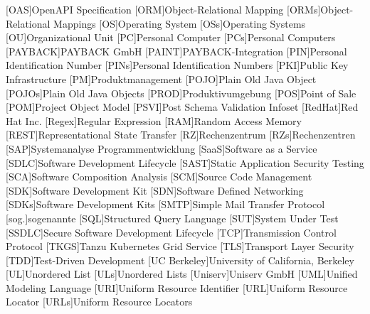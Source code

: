 \begin{acronym}[]
        [OAS]{OpenAPI Specification}
        [ORM]{Object-Relational Mapping}
        [ORMs]{Object-Relational Mappings}
        [OS]{Operating System}
        [OSs]{Operating Systems}
        [OU]{Organizational Unit}
        [PC]{Personal Computer}
        [PCs]{Personal Computers}
        [PAYBACK]{PAYBACK GmbH}
        [PAINT]{PAYBACK-Integration}
        [PIN]{Personal Identification Number}
        [PINs]{Personal Identification Numbers}
        [PKI]{Public Key Infrastructure}
        [PM]{Produktmanagement}
        [POJO]{Plain Old Java Object}
        [POJOs]{Plain Old Java Objects}
        [PROD]{Produktivumgebung}
        [POS]{Point of Sale}
        [POM]{Project Object Model}
        [PSVI]{Post Schema Validation Infoset}
        [RedHat]{Red Hat Inc.}
        [Regex]{Regular Expression}
        [RAM]{Random Access Memory}
        [REST]{Representational State Transfer}
        [RZ]{Rechenzentrum}
        [RZs]{Rechenzentren}
        [SAP]{Systemanalyse Programmentwicklung}
        [SaaS]{Software as a Service}
        [SDLC]{Software Development Lifecycle}
        [SAST]{Static Application Security Testing}
        [SCA]{Software Composition Analysis}
        [SCM]{Source Code Management}
        [SDK]{Software Development Kit}
        [SDN]{Software Defined Networking}
        [SDKs]{Software Development Kits}
        [SMTP]{Simple Mail Transfer Protocol}
        [sog.]{sogenannte}
        [SQL]{Structured Query Language}
        [SUT]{System Under Test}
        [SSDLC]{Secure Software Development Lifecycle}
        [TCP]{Transmission Control Protocol}
        [TKGS]{Tanzu Kubernetes Grid Service}
        [TLS]{Transport Layer Security}
        [TDD]{Test-Driven Development}
        [UC Berkeley]{University of California, Berkeley}
        [UL]{Unordered List}
        [ULs]{Unordered Lists}
        [Uniserv]{Uniserv GmbH}
        [UML]{Unified Modeling Language}
        [URI]{Uniform Resource Identifier}
        [URL]{Uniform Resource Locator}
        [URLs]{Uniform Resource Locators}

\end{acronym}
